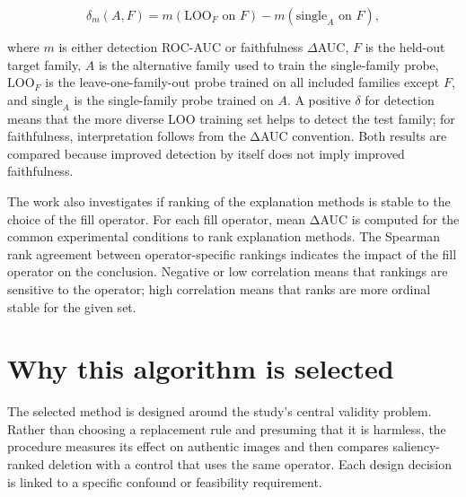 \begin{equation}
    \delta_m(A, F) = m(\mathrm{LOO}_F \text{ on } F) - m(\mathrm{single}_A \text{ on } F),
    \label{eq:diversity-delta}
\end{equation}

\noindent where $m$ is either detection ROC-AUC or faithfulness
$\Delta$AUC, $F$ is the held-out target family, $A$ is the alternative
family used to train the single-family probe, $\mathrm{LOO}_F$ is the
leave-one-family-out probe trained on all included families except $F$,
and $\mathrm{single}_A$ is the single-family probe trained on $A$. A positive $\delta$
for detection means that the more diverse LOO training set helps to
detect the test family; for faithfulness, interpretation follows from
the ΔAUC convention. Both results are compared because improved
detection by itself does not imply improved faithfulness.

The work also investigates if ranking of the explanation methods is
stable to the choice of the fill operator. For each fill operator, mean
ΔAUC is computed for the common experimental conditions to rank
explanation methods. The Spearman rank agreement between
operator-specific rankings indicates the impact of the fill operator on
the conclusion. Negative or low correlation means that rankings are
sensitive to the operator; high correlation means that ranks are more
ordinal stable for the given set.

\section{\texorpdfstring{\textbf{Why this algorithm is
selected}}{Why this algorithm is selected}}\label{why-this-algorithm-is-selected}

The selected method is designed around the study's central validity
problem. Rather than choosing a replacement rule and presuming that it
is harmless, the procedure measures its effect on authentic images and
then compares saliency-ranked deletion with a control that uses the same
operator. Each design decision is linked to a specific confound or
feasibility requirement.

